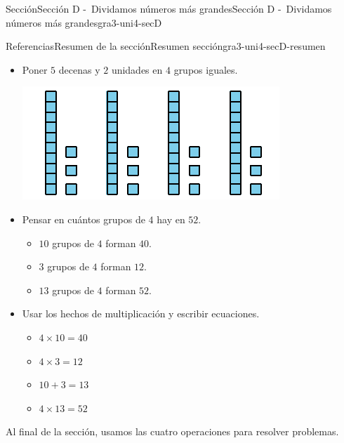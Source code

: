 \documentclass[twoside,10pt,]{article}
\begin{document}
\begin{sectionptx}{Sección}{Sección D -~Dividamos números más grandes}{}{Sección D -~Dividamos números más grandes}{}{}{gra3-uni4-secD}
\begin{references-subsection}{Referencias}{Resumen de la sección}{}{Resumen sección}{}{}{gra3-uni4-secD-resumen}
%
\begin{itemize}[label=\textbullet]
\item{}Poner \(5\) decenas y \(2\) unidades en \(4\) grupos iguales.%
\begin{image}{0}{1}{0}{}%
\includegraphics[width=\linewidth]{external/svg-source/tikz-file-147697-scale13.pdf}
\end{image}%
\item{}Pensar en cuántos grupos de \(4\) hay en \(52\).%
%
\begin{itemize}[label=$\circ$]
\item{}\(10\) grupos de \(4\) forman \(40\).%
\item{}\(3\) grupos de \(4\) forman \(12\).%
\item{}\(13\) grupos de \(4\) forman \(52\).%
\end{itemize}
\item{}Usar los hechos de multiplicación y escribir ecuaciones.%
%
\begin{itemize}[label=$\circ$]
\item{}\(\displaystyle 4 \times 10 = 40\)%
\item{}\(\displaystyle 4 \times 3 = 12\)%
\item{}\(\displaystyle 10 + 3 = 13\)%
\item{}\(\displaystyle 4 \times 13 = 52\)%
\end{itemize}
\end{itemize}
Al final de la sección, usamos las cuatro operaciones para resolver problemas.%
\end{references-subsection}
\end{sectionptx}
%
%
\typeout{************************************************}
\typeout{************************************************}
%
\end{document}

